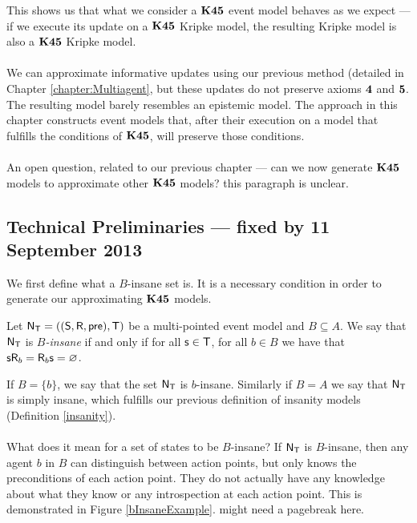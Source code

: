 This shows us that what we consider a $\bf K45$ event model behaves as we expect --- if we execute
its update on a $\bf K45$ Kripke model, the resulting Kripke model is also a $\bf K45$ Kripke model.\\
\\
We can approximate informative updates using our previous method (detailed in Chapter
\ref{chapter:Multiagent}, but these updates do not preserve
axioms $\bf 4$ and $\bf 5$.
The resulting model barely resembles an epistemic model.
The approach in this chapter constructs event models that, after their execution on a model that
fulfills the conditions of $\bf K45$, will preserve those conditions.\\
\\
An open question, related to our previous chapter --- can we now generate $\bf K45$ models to
approximate other $\bf K45$ models?
\FIXME this paragraph is unclear.

\subsection{Technical Preliminaries --- fixed by 11 September 2013}

We first define what a $B$-insane set is.
It is a necessary condition in order to generate our approximating $\bf K45$ models.

\begin{defn} \label{binsane}
	Let $\mathrm{\mathsf{N}}_\mathrm{\mathsf{T}} = ((\mathrm{\mathsf{S}}, \mathrm{\mathsf{R}}, \mathrm{\mathsf{pre}}), \mathrm{\mathsf{T}})$ be a multi-pointed event model and $B \subseteq A$.
	We say that $\mathrm{\mathsf{N}}_\mathrm{\mathsf{T}}$ is {\em $B$-insane} if and only if for all $\mathrm{\mathsf{s}} \in \mathrm{\mathsf{T}}$,
	for all $b \in B$ we have that $\mathrm{\mathsf{s}} \mathrm{\mathsf{R}}_b = \mathrm{\mathsf{R}}_b \mathrm{\mathsf{s}} = \varnothing$.
\end{defn}

If $B = \{b\}$, we say that the set $\mathrm{\mathsf{N}}_\mathrm{\mathsf{T}}$ is $b$-insane.
Similarly if $B = A$ we say that $\mathrm{\mathsf{N}}_\mathrm{\mathsf{T}}$ is simply insane, which fulfills
our previous definition of insanity models (Definition \ref{insanity}).\\
\\
What does it mean for a set of states to be $B$-insane?
If $\mathrm{\mathsf{N}}_\mathrm{\mathsf{T}}$ is $B$-insane, then any agent $b$ in $B$ can distinguish between
action points, but only knows the preconditions of each action point.
They do not actually have any knowledge about what they know or any
introspection at each action point.
This is demonstrated in Figure \ref{bInsaneExample}.
\FIXME might need a pagebreak here.

